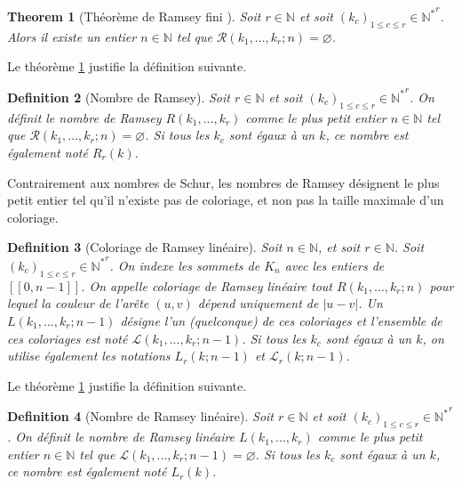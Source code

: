 \documentclass{article}
\newtheorem{definition}{Definition}[section]
\newtheorem{theorem}[definition]{Theorem}
\begin{document}
\begin{theorem}[Théorème de Ramsey fini \cite{Ramsey}]
\label{thm:ram}
Soit \(r \in \mathbb{N}\) et soit \((k_c)_{1 \leqslant c \leqslant r} \in {\mathbb{N}^*}^r\). Alors il existe un entier \(n \in \mathbb{N}\) tel que \(\mathcal{R}(k_1, ..., k_r ; n) = \varnothing\).
\end{theorem}

Le théorème \ref{thm:ram} justifie la définition suivante.

\begin{definition}[Nombre de Ramsey]
Soit \(r \in \mathbb{N}\) et soit \((k_c)_{1 \leqslant c \leqslant r} \in {\mathbb{N}^*}^r\). On définit le nombre de Ramsey \(R(k_1, ..., k_r)\) comme le plus petit entier \(n \in \mathbb{N}\) tel que \(\mathcal{R}(k_1, ..., k_r ; n) = \varnothing\). Si tous les \(k_c\) sont égaux à un \(k\), ce nombre est également noté \(R_r(k)\).
\end{definition}

Contrairement aux nombres de Schur, les nombres de Ramsey désignent le plus petit entier tel qu'il n'existe pas de coloriage, et non pas la taille maximale d'un coloriage.

\begin{definition}[Coloriage de Ramsey linéaire]
Soit \(n \in \mathbb{N}\), et soit \(r \in \mathbb{N}\). Soit \((k_c)_{1 \leqslant c \leqslant r} \in {\mathbb{N}^*}^r\). On indexe les sommets de \(K_n\) avec les entiers de \([\![0, n - 1]\!]\). On appelle coloriage de Ramsey linéaire tout \(R(k_1, ..., k_r ; n)\) pour lequel la couleur de l'arête \((u, v)\) dépend uniquement de \(|u - v|\). Un \(L(k_1, ..., k_r ; n - 1)\) désigne l'un (quelconque) de ces coloriages et l'ensemble de ces coloriages est noté \(\mathcal{L}(k_1, ..., k_r ; n - 1)\). Si tous les \(k_c\) sont égaux à un \(k\), on utilise également les notations \(L_r(k; n - 1)\) et \(\mathcal{L}_r(k; n - 1)\).
\end{definition}

Le théorème \ref{thm:ram} justifie la définition suivante.

\begin{definition}[Nombre de Ramsey linéaire]
Soit \(r \in \mathbb{N}\) et soit \((k_c)_{1 \leqslant c \leqslant r} \in {\mathbb{N}^*}^r\). On définit le nombre de Ramsey linéaire \(L(k_1, ..., k_r)\) comme le plus petit entier \(n \in \mathbb{N}\) tel que \(\mathcal{L}(k_1, ..., k_r ; n - 1) = \varnothing\). Si tous les \(k_c\) sont égaux à un \(k\), ce nombre est également noté \(L_r(k)\).
\end{definition}
\end{document}
